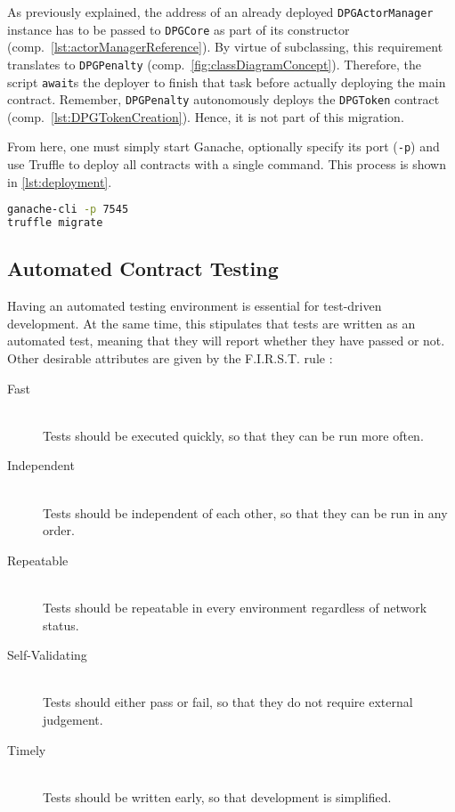 As previously explained, the address of an already deployed \texttt{DPGActorManager} instance has to be passed to \texttt{DPGCore} as part of its constructor (comp.~\autoref{lst:actorManagerReference}). By virtue of subclassing, this requirement translates to \texttt{DPGPenalty} (comp.~\autoref{fig:classDiagramConcept}). Therefore, the script \texttt{await}s the deployer to finish that task before actually deploying the main contract. Remember, \texttt{DPGPenalty} autonomously deploys the \texttt{DPGToken} contract (comp.~\ref{lst:DPGTokenCreation}). Hence, it is not part of this migration.

From here, one must simply start Ganache, optionally specify its port (\texttt{-p}) and use Truffle to deploy all contracts with a single command. This process is shown in \autoref{lst:deployment}.

\begin{lstlisting}[language=bash, caption=Deploying to Ganache, label=lst:deployment]
ganache-cli -p 7545
truffle migrate
\end{lstlisting}

\subsection{Automated Contract Testing}
Having an automated testing environment is essential for test-driven development. At the same time, this stipulates that tests are written as an automated test, meaning that they will report whether they have passed or not. Other desirable attributes are given by the F.I.R.S.T. rule \cite[p.~132]{firstUnitTests}:

\begin{description}
	\item[Fast]
  	\hfill \\
  	Tests should be executed quickly, so that they can be run more often.
  	\item[Independent]
  	\hfill \\
  	Tests should be independent of each other, so that they can be run in any order.
  	\item[Repeatable]
  	\hfill \\  
	Tests should be repeatable in every environment regardless of network status. 
  	\item[Self-Validating]
  	\hfill \\  
  	Tests should either pass or fail, so that they do not require external judgement.
	\item[Timely]
  	\hfill \\  
  	Tests should be written early, so that development is simplified.
\end{description}


